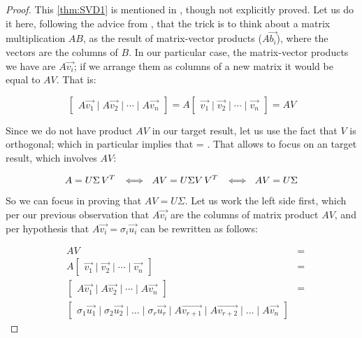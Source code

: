 \begin{proof}
This \cref{thm:SVD1} is mentioned in \cite{kalman96}, though not
explicitly proved. Let us do it here, following the advice from
\cite{strang88}, that the trick is to think about a matrix
multiplication $A B$, as the result of matrix-vector products ($A
\vec{b_i}$), where the vectors are the columns of $B$. In our particular
case, the matrix-vector products we have are $A\vec{v_i}$; if we
arrange them as columns of a new matrix it would be equal to $A
V$. That is: 

\[
\begin{bmatrix}
  A\vec{v_1} \mid A\vec{v_2} \mid \cdots \mid A\vec{v_n} 
\end{bmatrix} = 
A 
\begin{bmatrix}
  \vec{v_1} \mid \vec{v_2} \mid \cdots \mid \vec{v_n} 
\end{bmatrix} =
AV
\]
\hfill

Since we do not have product $AV$ in our target result, let us use the
fact that $V$ is orthogonal; which in particular implies that 
= . That allows to focus on an target result, which involves
$AV$: 

\[
A   = U \Sigma \,{V}^{T}\, \,\,\iff\,\,
A V = U \Sigma V \,{V}^{T}\, \,\,\iff\,\,
A V = U \Sigma
\]
\hfill

So we can focus in proving that $A V = U \Sigma$. Let us work
the left side first, which per our previous observation that
$A\vec{v_i}$ are the columns of matrix product $AV$, and per hypothesis
that $A\vec{v_i} = \sigma_i\vec{u_i}$ can be rewritten as follows:

\begin{align*}
  & A V &= \\
  & A \begin{bmatrix}
    \vec{v_1} \mid \vec{v_2} \mid \cdots \mid \vec{v_n} 
  \end{bmatrix} &= \\
  & \begin{bmatrix}
      A\vec{v_1} \mid A\vec{v_2} \mid \cdots \mid A\vec{v_n} 
    \end{bmatrix} &= \\
  & \begin{bmatrix} 
      \sigma_1\vec{u_1} \mid \sigma_2\vec{u_2} \mid \dots \mid \sigma_r\vec{u_r} 
      \mid A\vec{v_{r+1}} \mid A\vec{v_{r+2}} \mid \dots \mid A\vec{v_{n}} 
    \end{bmatrix}
\end{align*}
\hfill


\end{proof}
